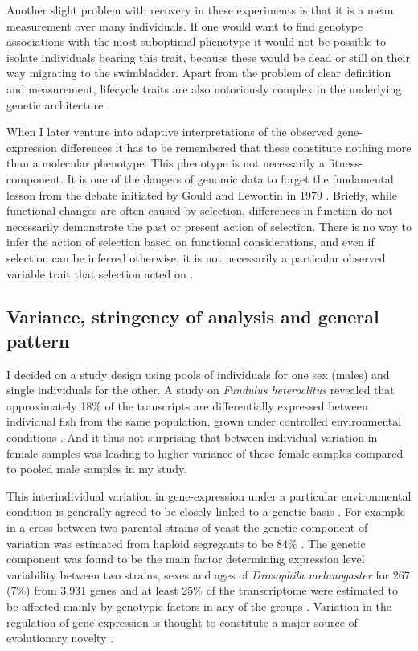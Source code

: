 Another slight problem with recovery in these experiments is that it
is a mean measurement over many individuals. If one would want to find
genotype associations with the most suboptimal phenotype it would not
be possible to isolate individuals bearing this trait, because these
would be dead or still on their way migrating to the
swimbladder. Apart from the problem of clear definition and
measurement, lifecycle traits are also notoriously complex in the
underlying genetic architecture \cite{pmid18454194}.

When I later venture into adaptive interpretations of the observed
gene-expression differences it has to be remembered that these
constitute nothing more than a molecular phenotype. This phenotype is
not necessarily a fitness-component. It is one of the dangers of
genomic data to forget the fundamental lesson from the debate
initiated by Gould and Lewontin in 1979
\cite{gould_spandrels_1979}. Briefly, while functional changes are
often caused by selection, differences in function do not necessarily
demonstrate the past or present action of selection. There is no way
to infer the action of selection based on functional considerations,
and even if selection can be inferred otherwise, it is not necessarily
a particular observed variable trait that selection acted on
\cite{pmid19744124}.

\subsection{Variance, stringency of analysis and general pattern}
\label{sec:sample-twelve}

I decided on a study design using pools of individuals for one sex
(males) and single individuals for the other. A study on
\textit{Fundulus heteroclitus} revealed that approximately 18\% of the
transcripts are differentially expressed between individual fish from
the same population, grown under controlled environmental conditions
\cite{pmid12219088}. And it thus not surprising that between
individual variation in female samples was leading to higher variance
of these female samples compared to pooled male samples in my study.

This interindividual variation in gene-expression under a particular
environmental condition is generally agreed to be closely linked to a
genetic basis \cite{pmid15498452}. For example in a cross between two
parental strains of yeast the genetic component of variation was
estimated from haploid segregants to be 84\% \cite{pmid11923494}. The
genetic component was found to be the main factor determining
expression level variability between two strains, sexes and ages of
\textit{Drosophila melanogaster} for 267 (7\%) from 3,931 genes and at
least 25\% of the transcriptome were estimated to be affected mainly
by genotypic factors in any of the groups
\cite{pmid11726925}. Variation in the regulation of gene-expression is
thought to constitute a major source of evolutionary novelty
\cite{pmid11341673}.


